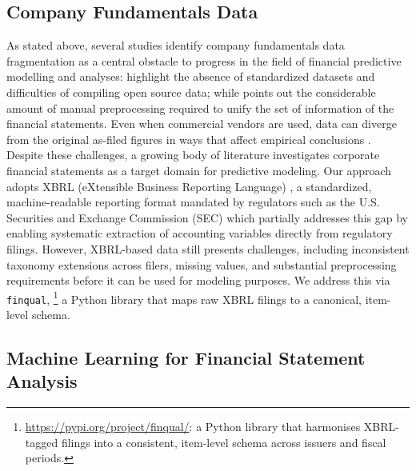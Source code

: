 \documentclass[a4paper,fleqn]{cas-dc}
\newcommand{\nauel}[1]{{\color{orange}{\textbf{Nauel}: #1}}}
\newcommand{\angela}[1]{{\color{magenta}{\textbf{Angela}: #1}}}
\begin{document}
\subsection{Company Fundamentals Data} \label{sec:company_fundamentals}
 As stated above, several studies identify company fundamentals data fragmentation as a central obstacle to progress in the field of financial predictive modelling and analyses: \cite{zavitsanos_machine_2025} highlight the absence of standardized datasets and difficulties of compiling open source data; while \cite{divo_forecasting_2025} points out the considerable amount of manual preprocessing required to unify the set of information of the financial statements. Even when commercial vendors are used, data can diverge from the original as-filed figures in ways that affect empirical conclusions \citep{du_lost_2023}. Despite these challenges, a growing body of literature investigates corporate financial statements as a target domain for predictive modeling. Our approach adopts XBRL (eXtensible Business Reporting Language) \citep{xbrl2024}, a standardized, machine-readable reporting format mandated by regulators such as the U.S. Securities and Exchange Commission (SEC) which partially addresses this gap by enabling systematic extraction of accounting variables directly from regulatory filings. However, XBRL-based data still presents challenges, including inconsistent taxonomy extensions across filers, missing values, and substantial preprocessing requirements before it can be used for modeling purposes. We address this via \texttt{finqual}, \footnote{\url{https://pypi.org/project/finqual/}: a Python library that
harmonises XBRL-tagged filings into a consistent, item-level schema across issuers and fiscal periods.}
a Python library that maps raw XBRL filings to a canonical, item-level schema.

\subsection{Machine Learning for Financial Statement Analysis}
\end{document}
